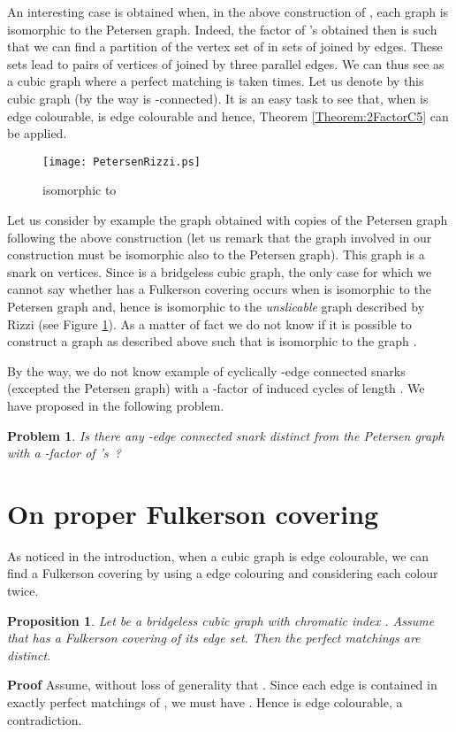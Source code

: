 \documentclass{amsart}
\newtheorem{prop}[thm]{Proposition}
\newtheorem{prob}[thm]{Problem}
\theoremstyle{definition}
\theoremstyle{remark}
\newenvironment{prf}{{\bf \noindent Proof } }{\hfill\\}
\begin{document}
An interesting case is obtained when, in the above construction of
, each graph  is isomorphic to the Petersen graph. Indeed,
the factor of 's obtained then is such that we can find a
partition of the vertex set of  in sets of   joined
by  edges. These sets lead to pairs of vertices of  joined
by three parallel edges. We can thus see  as a cubic graph
where a perfect matching is taken  times. Let us denote by
 this cubic graph (by the way  is
-connected). It is an easy task to see that, when  is
edge colourable,  is edge colourable and hence,
Theorem \ref{Theorem:2FactorC5} can be applied.

\begin{figure}
\texttt{[image: PetersenRizzi.ps]}
 \caption{ isomorphic to } \label{Figure:UnslicableP3}
\end{figure}

Let us consider by example the graph  obtained with  copies of
the Petersen graph following the above construction (let us remark
that the graph   involved in our construction  must be isomorphic
also to the Petersen graph). This graph is a snark on  vertices.
Since  is a bridgeless cubic graph, the only case for
which we cannot say whether  has a Fulkerson covering occurs when
 is isomorphic to the Petersen graph and, hence 
is isomorphic to the {\em unslicable} graph 
described by Rizzi \cite{Riz99} (see Figure
\ref{Figure:UnslicableP3}). As a matter of fact we do not know if it is possible to construct a graph  as described above such that  is isomorphic to the graph .

By the way, we do not know example of cyclically -edge connected
snarks (excepted the Petersen graph)  with a -factor of induced
cycles of length . We have proposed in \cite{FouVan09a} the
following problem.

\begin{prob} Is there any -edge connected snark distinct from the Petersen
graph
with a -factor of 's~?
\end{prob}





\section{On proper Fulkerson covering\label{Section:FulkersonProperCovering}}


As noticed in the introduction, when a cubic graph is edge
colourable, we can find a Fulkerson covering by using a edge
colouring and considering each colour twice.
\begin{prop} \label{Proposition:ProperIndex4}
Let  be a bridgeless cubic graph with chromatic index . Assume
that  has a Fulkerson covering  of its edge set. Then the 
perfect matchings are distinct.
\end{prop}
\begin{prf}Assume, without loss of generality that .
Since each edge is contained in exactly  perfect matchings of
, we must have . Hence 
is edge colourable, a contradiction.
\end{prf}
\end{document}
